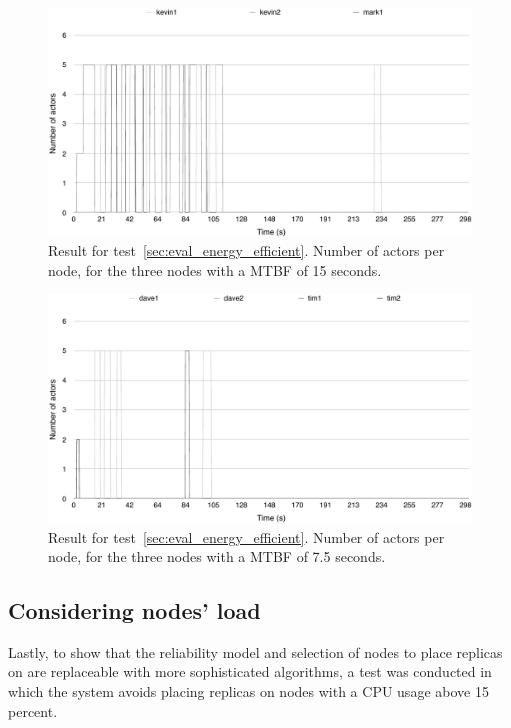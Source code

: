 \documentclass{cslthse-msc}
\begin{document}
\begin{figure}[!hbt]
\centering
\includegraphics[scale=0.5]{images/results/energy_efficient/MTBF_15.pdf}
\caption{Result for test~\ref{sec:eval_energy_efficient}. Number of actors per node, for the three nodes with a MTBF of 15 seconds.} \label{fig:eval_energy_efficient_mtbf_15}
\end{figure}

\begin{figure}[!hbt]
\centering
\includegraphics[scale=0.5]{images/results/energy_efficient/MTBF_75.pdf}
\caption{Result for test~\ref{sec:eval_energy_efficient}. Number of actors per node, for the three nodes with a MTBF of 7.5 seconds.} \label{fig:eval_energy_efficient_mtbf_75}
\end{figure}

\subsection{Considering nodes' load} \label{sec:eval_replaceable_model}
Lastly, to show that the reliability model and selection of nodes to place replicas on are replaceable with more sophisticated algorithms, a test was conducted in which the system avoids placing replicas on nodes with a CPU usage above 15 percent. 
\end{document}
